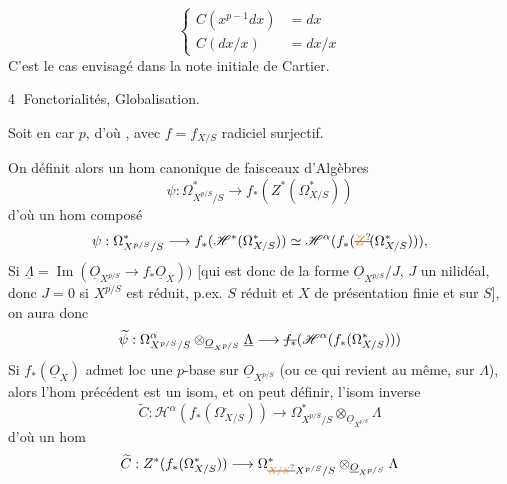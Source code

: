 \[
 \left\{\begin{aligned}
 C(x^{p-1}dx)&=dx\\
 C(dx/x)&=dx/x
 \end{aligned}\right.
\]
C'est le cas envisagé dans la note initiale de Cartier.

\textcircled{4} Fonctorialités, Globalisation.

Soit
en car $p$, d'où
, avec $f=f_{X/S}$ radiciel  surjectif.


On définit alors un hom canonique de faisceaux d'Algèbres
\[
 \psi:\Omega^*_{X^{p/S}/S}\longrightarrow f_*(Z^*(\Omega^*_{X/S}))
\]
d'où un hom composé
\[
 \psi:\Omega^*_{X^{p/S}/S}\longrightarrow f_*(\mathscr H^*(\Omega^*_{X/S}))
 \simeq\mathscr H^\alpha(f_*(\deleted{\unsure{Z}}\!(\Omega^*_{X/S}))),
\]
Si $\underline\Lambda=\operatorname{Im}(\underline O_{X^{p/S}}\longrightarrow f_*\underline O_X))$ [qui est donc de la forme $\underline O_{X^{p/S}}/J$, $J$ un nilidéal, donc $J=0$ si $X^{p/S}$ est réduit, p.ex. $S$ réduit et $X$  de présentation finie et  sur $S$], on aura donc
\[
 \widetilde\psi:\Omega^\alpha_{X^{p/S}/S}\otimes_{\underline O_{X^{p/S}}}\underline\Lambda
 \longrightarrow\deleted{f_*}(\mathscr H^\alpha(f_*(\Omega^*_{X/S})))
\]
Si $f_*(\underline O_X)$ admet loc une $p$-base sur $\underline O_{X^{p/S}}$ (ou ce qui revient au même, sur $\Lambda$), alors l'hom précédent est un isom, et on peut définir,  l'isom inverse
\[
 \widetilde C:\mathscr H^\alpha(f_*(\Omega^\cdot_{X/S}))
 \longrightarrow\Omega^*_{X^{p/S}/S}\otimes_{\underline O_{X^{p/S}}}\Lambda
\]
d'où un hom
\[
 \widetilde C:Z^*(f_*(\Omega^*_{X/S}))\longrightarrow
 \Omega^*_{\deleted{\unsure{X/S}}X^{p/S}/S}\otimes_{\underline O_{X^{p/S}}}\Lambda
\]

